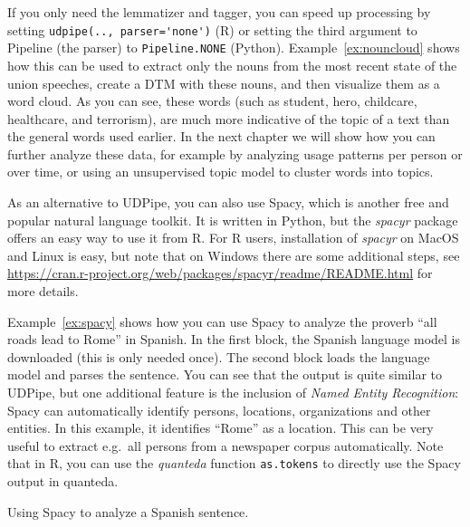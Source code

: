 If you only need the lemmatizer and tagger, you can speed up processing by setting \verb|udpipe(.., parser='none')| (R) or setting the third argument to Pipeline (the parser) to \verb|Pipeline.NONE| (Python).
Example~\ref{ex:nouncloud} shows how this can be used to extract only the nouns from the most recent state of the union speeches,
create a DTM with these nouns, and then visualize them as a word cloud.
As you can see, these words (such as student, hero, childcare, healthcare, and terrorism), are much more indicative of the topic of a text than the general words used earlier.
In the next chapter we will show how you can further analyze these data, for example by analyzing usage patterns per person or over time, or using an unsupervised topic model to cluster words into topics.


As an alternative to UDPipe, you can also use Spacy,
which is another free and popular natural language toolkit.
It is written in Python, but the \emph{spacyr} package offers an easy way to use it from R.
For R users, installation of \emph{spacyr} on MacOS and Linux is easy,
but note that on Windows there are some additional steps, see
\url{https://cran.r-project.org/web/packages/spacyr/readme/README.html} for more details.

Example~\ref{ex:spacy} shows how you can use Spacy to analyze the proverb ``all roads lead to Rome'' in Spanish.
In the first block, the Spanish language model is downloaded (this is only needed once).
The second block loads the language model and parses the sentence.
You can see that the output is quite similar to UDPipe, but one additional feature is the inclusion of
\emph{Named Entity Recognition}:
Spacy can automatically identify persons, locations, organizations and other entities.
In this example, it identifies ``Rome'' as a location.
This can be very useful to extract e.g.\ all persons from a newspaper corpus automatically.
Note that in R, you can use the \emph{quanteda} function \texttt{as.tokens} to directly use the Spacy output in quanteda.

\begin{ccsexample}
  \caption{Using Spacy to analyze a Spanish sentence.}\label{ex:spacy}
\end{ccsexample}

